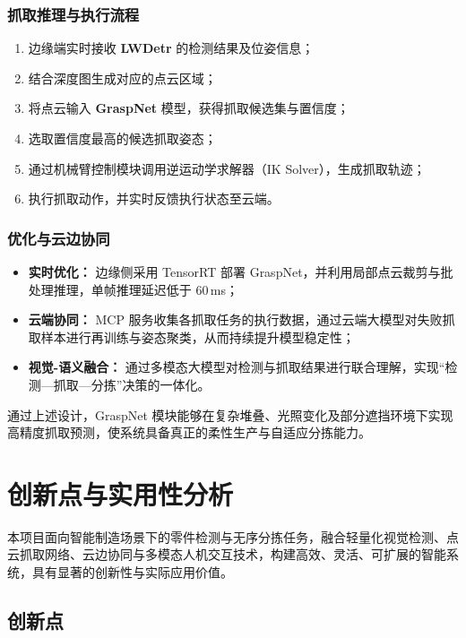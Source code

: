 \documentclass{cumcmthesis}
\begin{document}
\subsubsection{抓取推理与执行流程}

\begin{enumerate}
    \item 边缘端实时接收 \textbf{LWDetr} 的检测结果及位姿信息；
    \item 结合深度图生成对应的点云区域；
    \item 将点云输入 \textbf{GraspNet} 模型，获得抓取候选集与置信度；
    \item 选取置信度最高的候选抓取姿态；
    \item 通过机械臂控制模块调用逆运动学求解器（IK Solver），生成抓取轨迹；
    \item 执行抓取动作，并实时反馈执行状态至云端。
\end{enumerate}

\subsubsection{优化与云边协同}

\begin{itemize}
    \item \textbf{实时优化：} 边缘侧采用 TensorRT 部署 GraspNet，并利用局部点云裁剪与批处理推理，单帧推理延迟低于 60\,ms；
    \item \textbf{云端协同：} MCP 服务收集各抓取任务的执行数据，通过云端大模型对失败抓取样本进行再训练与姿态聚类，从而持续提升模型稳定性；
    \item \textbf{视觉-语义融合：} 通过多模态大模型对检测与抓取结果进行联合理解，实现“检测—抓取—分拣”决策的一体化。
\end{itemize}

通过上述设计，GraspNet 模块能够在复杂堆叠、光照变化及部分遮挡环境下实现高精度抓取预测，使系统具备真正的柔性生产与自适应分拣能力。


\section{创新点与实用性分析}

本项目面向智能制造场景下的零件检测与无序分拣任务，融合轻量化视觉检测、点云抓取网络、云边协同与多模态人机交互技术，构建高效、灵活、可扩展的智能系统，具有显著的创新性与实际应用价值。

\subsection{创新点}
\end{document}
